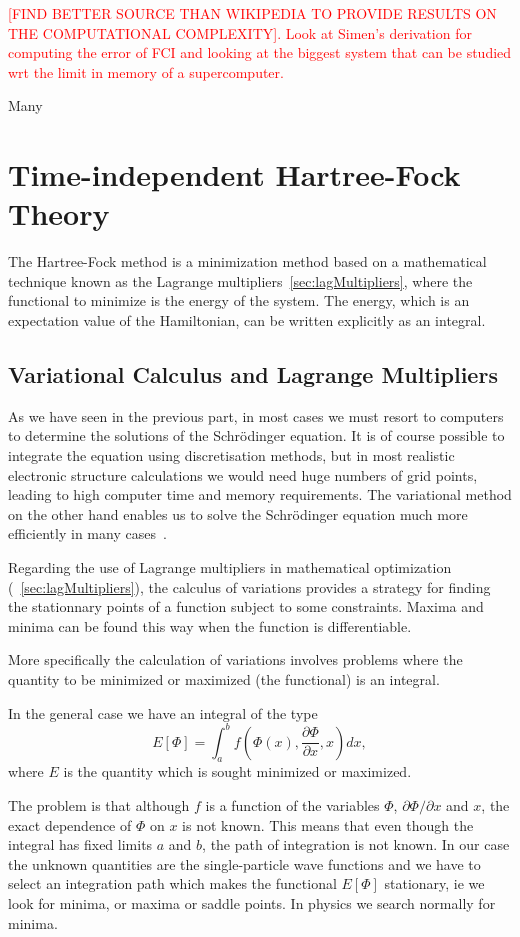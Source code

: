 \textcolor{red}{[FIND BETTER SOURCE THAN WIKIPEDIA TO PROVIDE RESULTS ON THE COMPUTATIONAL COMPLEXITY]. Look at Simen's derivation for computing the error of FCI and looking at the biggest system that can be studied wrt the limit in memory of a supercomputer.}

Many ~\cite{Bartlett1981}


\section{Time-independent Hartree-Fock Theory}
The Hartree-Fock method is a minimization method based on a mathematical technique known as the Lagrange multipliers~\ref{sec:lagMultipliers}, where the functional to minimize is the energy of the system. The energy, which is an expectation value of the Hamiltonian, can be written explicitly as an integral. 


\subsection{Variational Calculus and Lagrange Multipliers}
\label{variationalCalculus}

As we have seen in the previous part, in most cases we must resort to computers to determine the solutions of the Schr\"odinger equation. It is of course possible to integrate the equation using discretisation methods, but in most realistic electronic structure calculations we would need huge numbers of grid points, leading to high computer time and memory requirements. The variational method on the other hand enables us to solve the Schr\"odinger equation much more efficiently in many cases~\cite{Thijssen2007}.

Regarding the use of Lagrange multipliers in mathematical optimization (~\ref{sec:lagMultipliers}), the calculus of variations provides a strategy for finding the stationnary points of a function subject to some constraints. Maxima and minima can be found this way when the function is differentiable.

More specifically the calculation of variations involves problems where the quantity to be minimized or maximized (the functional) is an integral.

In the general case we have an integral of the type
\[ E[\Phi]= \int_a^b f(\Phi(x),\frac{\partial \Phi}{\partial x},x)dx,\]
where $E$ is the quantity which is sought minimized or maximized.

The problem is that although $f$ is a function of the variables $\Phi$, $\partial \Phi/\partial x$ and $x$, the exact dependence of
$\Phi$ on $x$ is not known.  This means that even though the integral has fixed limits $a$ and $b$, the path of integration is
not known. In our case the unknown quantities are the single-particle wave functions and we have to select an integration path which makes
the functional $E[\Phi]$ stationary, ie we look for minima, or maxima or saddle points. In physics we search normally for minima.

